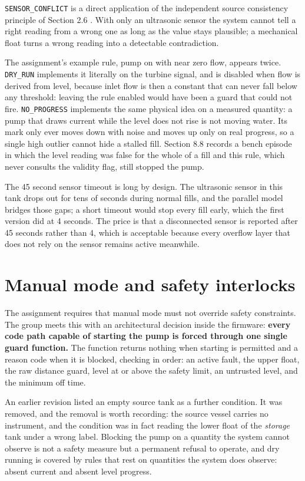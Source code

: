 \texttt{SENSOR\_CONFLICT} is a direct application of the independent source consistency principle of Section 2.6 \cite{isermann2006}. With only an ultrasonic sensor the system cannot tell a right reading from a wrong one as long as the value stays plausible; a mechanical float turns a wrong reading into a detectable contradiction.

The assignment's example rule, pump on with near zero flow, appears twice. \texttt{DRY\_RUN} implements it literally on the turbine signal, and is disabled when flow is derived from level, because inlet flow is then a constant that can never fall below any threshold: leaving the rule enabled would have been a guard that could not fire. \texttt{NO\_PROGRESS} implements the same physical idea on a measured quantity: a pump that draws current while the level does not rise is not moving water. Its mark only ever moves down with noise and moves up only on real progress, so a single high outlier cannot hide a stalled fill. Section 8.8 records a bench episode in which the level reading was false for the whole of a fill and this rule, which never consults the validity flag, still stopped the pump.

The 45 second sensor timeout is long by design. The ultrasonic sensor in this tank drops out for tens of seconds during normal fills, and the parallel model bridges those gaps; a short timeout would stop every fill early, which the first version did at 4 seconds. The price is that a disconnected sensor is reported after 45 seconds rather than 4, which is acceptable because every overflow layer that does not rely on the sensor remains active meanwhile.

\section{Manual mode and safety interlocks}

The assignment requires that manual mode must not override safety constraints. The group meets this with an architectural decision inside the firmware: \textbf{every code path capable of starting the pump is forced through one single guard function.} The function returns nothing when starting is permitted and a reason code when it is blocked, checking in order: an active fault, the upper float, the raw distance guard, level at or above the safety limit, an untrusted level, and the minimum off time.

An earlier revision listed an empty source tank as a further condition. It was removed, and the removal is worth recording: the source vessel carries no instrument, and the condition was in fact reading the lower float of the \emph{storage} tank under a wrong label. Blocking the pump on a quantity the system cannot observe is not a safety measure but a permanent refusal to operate, and dry running is covered by rules that rest on quantities the system does observe: absent current and absent level progress.

